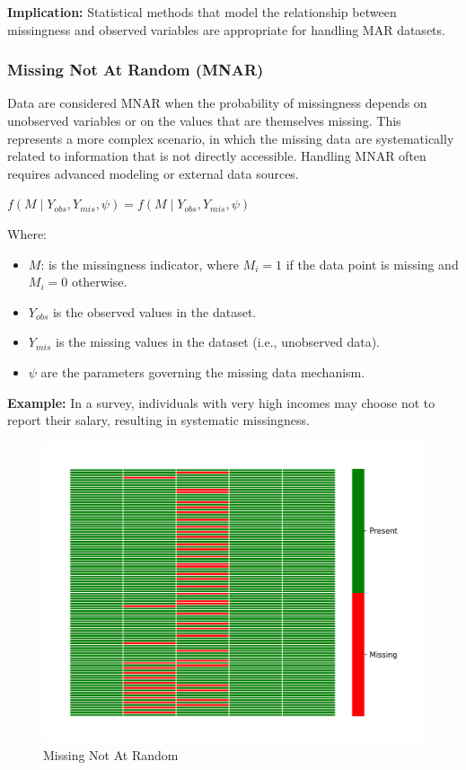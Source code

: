 \documentclass[a4paper,12pt]{article}
\begin{document}
\textbf{Implication:} Statistical methods that model the relationship between missingness and observed variables are appropriate for handling MAR datasets.

\subsubsection{Missing Not At Random (MNAR)}

Data are considered MNAR when the probability of missingness depends on unobserved variables or on the values that are themselves missing. This represents a more complex scenario, in which the missing data are systematically related to information that is not directly accessible. Handling MNAR often requires advanced modeling or external data sources. ~\cite{24}

\begin{center}
$f(M \mid Y_{obs}, Y_{mis}, \psi) = f(M \mid Y_{obs}, Y_{mis}, \psi)$
\end{center}

Where:
\begin{itemize}
    \item \( M \): is the missingness indicator, where \( M_i = 1 \) if the data point is missing and \( M_i = 0 \) otherwise.
    \item \( Y_{obs} \) is the observed values in the dataset.
    \item \( Y_{mis} \) is the missing values in the dataset (i.e., unobserved data).
    \item \( \psi \) are the parameters governing the missing data mechanism.
\end{itemize}


\textbf{Example:} In a survey, individuals with very high incomes may choose not to report their salary, resulting in systematic missingness.

\begin{figure}[H]
\centering
\includegraphics[width=0.5\linewidth]{MNAR_heatmap.png}
\caption{Missing Not At Random}
\end{figure}
\end{document}
